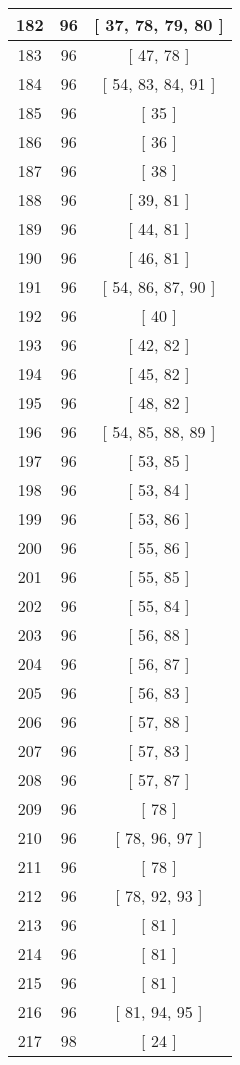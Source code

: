 \begin{center}
\begin{longtable}[H]{|| c c c ||}
\hline
182 & 96 & [ 37, 78, 79, 80 ] \\ 
\hline
183 & 96 & [ 47, 78 ] \\ 
\hline
184 & 96 & [ 54, 83, 84, 91 ] \\ 
\hline
185 & 96 & [ 35 ] \\ 
\hline
186 & 96 & [ 36 ] \\ 
\hline
187 & 96 & [ 38 ] \\ 
\hline
188 & 96 & [ 39, 81 ] \\ 
\hline
189 & 96 & [ 44, 81 ] \\ 
\hline
190 & 96 & [ 46, 81 ] \\ 
\hline
191 & 96 & [ 54, 86, 87, 90 ] \\ 
\hline
192 & 96 & [ 40 ] \\ 
\hline
193 & 96 & [ 42, 82 ] \\ 
\hline
194 & 96 & [ 45, 82 ] \\ 
\hline
195 & 96 & [ 48, 82 ] \\ 
\hline
196 & 96 & [ 54, 85, 88, 89 ] \\ 
\hline
197 & 96 & [ 53, 85 ] \\ 
\hline
198 & 96 & [ 53, 84 ] \\ 
\hline
199 & 96 & [ 53, 86 ] \\ 
\hline
200 & 96 & [ 55, 86 ] \\ 
\hline
201 & 96 & [ 55, 85 ] \\ 
\hline
202 & 96 & [ 55, 84 ] \\ 
\hline
203 & 96 & [ 56, 88 ] \\ 
\hline
204 & 96 & [ 56, 87 ] \\ 
\hline
205 & 96 & [ 56, 83 ] \\ 
\hline
206 & 96 & [ 57, 88 ] \\ 
\hline
207 & 96 & [ 57, 83 ] \\ 
\hline
208 & 96 & [ 57, 87 ] \\ 
\hline
209 & 96 & [ 78 ] \\ 
\hline
210 & 96 & [ 78, 96, 97 ] \\ 
\hline
211 & 96 & [ 78 ] \\ 
\hline
212 & 96 & [ 78, 92, 93 ] \\ 
\hline
213 & 96 & [ 81 ] \\ 
\hline
214 & 96 & [ 81 ] \\ 
\hline
215 & 96 & [ 81 ] \\ 
\hline
216 & 96 & [ 81, 94, 95 ] \\ 
\hline
217 & 98 & [ 24 ] \\ 

\end{longtable}
\end{center}

